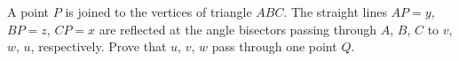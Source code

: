 A point $P$ is joined to the vertices of triangle $ABC$. The straight lines $AP = y$, $BP = z$, $CP = x$ are reflected at the angle bisectors passing through $A$, $B$, $C$ to $v$, $w$, $u$, respectively. Prove that $u$, $v$, $w$ pass through one point $Q$.
